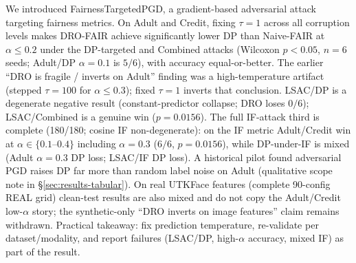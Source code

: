 We introduced FairnessTargetedPGD, a gradient-based adversarial attack targeting fairness metrics. On Adult and Credit, fixing $\tau=1$ across all corruption levels makes DRO-FAIR achieve significantly lower DP than Naive-FAIR at $\alpha\le0.2$ under the DP-targeted and Combined attacks (Wilcoxon $p<0.05$, $n=6$ seeds; Adult/DP $\alpha{=}0.1$ is $5/6$), with accuracy equal-or-better. The earlier ``DRO is fragile / inverts on Adult'' finding was a high-temperature artifact (stepped $\tau{=}100$ for $\alpha\le 0.3$); fixed $\tau{=}1$ inverts that conclusion. LSAC/DP is a degenerate negative result (constant-predictor collapse; DRO loses $0/6$); LSAC/Combined is a genuine win ($p{=}0.0156$). The full IF-attack third is complete (180/180; cosine IF non-degenerate): on the IF metric Adult/Credit win at $\alpha\in\{0.1$--$0.4\}$ including $\alpha{=}0.3$ ($6/6$, $p{=}0.0156$), while DP-under-IF is mixed (Adult $\alpha{=}0.3$ DP loss; LSAC/IF DP loss). A historical pilot found adversarial PGD raises DP far more than random label noise on Adult (qualitative scope note in \S\ref{sec:results-tabular}). On real UTKFace features (complete 90-config REAL grid) clean-test results are also mixed and do not copy the Adult/Credit low-$\alpha$ story; the synthetic-only ``DRO inverts on image features'' claim remains withdrawn. Practical takeaway: fix prediction temperature, re-validate per dataset/modality, and report failures (LSAC/DP, high-$\alpha$ accuracy, mixed IF) as part of the result.
